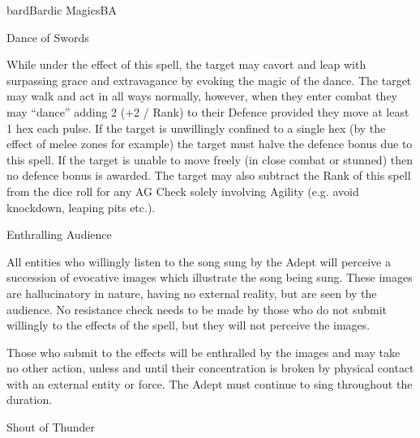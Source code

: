 \begin{College}[2.1]{bard}{Bardic Magics}{BA}
\begin{spell}[S-5]{Dance of Swords}
\begin{effects}
While under the effect of this spell, the target may cavort and leap
with surpassing grace and extravagance by evoking the magic of the
dance.  The target may walk and act in all ways normally, however,
when they enter combat they may “dance” adding 2 (+2 / Rank) to their
Defence provided they move at least 1 hex each pulse. If the target is
unwillingly confined to a single hex (by the effect of melee zones for
example) the target must halve the defence bonus due to this spell.
If the target is unable to move freely (in close combat or stunned)
then no defence bonus is awarded. The target may also subtract the
Rank of this spell from the dice roll for any AG Check solely
involving Agility (e.g. avoid knockdown, leaping pits etc.).
\end{effects}
\end{spell}

\begin{spell}[S-6]{Enthralling Audience}

\begin{effects}
All entities who willingly listen to the song sung by the Adept will
perceive a succession of evocative images which illustrate the song
being sung.  These images are hallucinatory in nature, having no
external reality, but are seen by the audience. No resistance check
needs to be made by those who do not submit willingly to the effects
of the spell, but they will not perceive the images.

Those who submit to the effects will be enthralled by the images and
may take no other action, unless and until their concentration is
broken by physical contact with an external entity or force. The Adept
must continue to sing throughout the duration.
\end{effects}
\end{spell}

\begin{spell}[S-7]{Shout of Thunder}


\end{spell}
\end{College}
